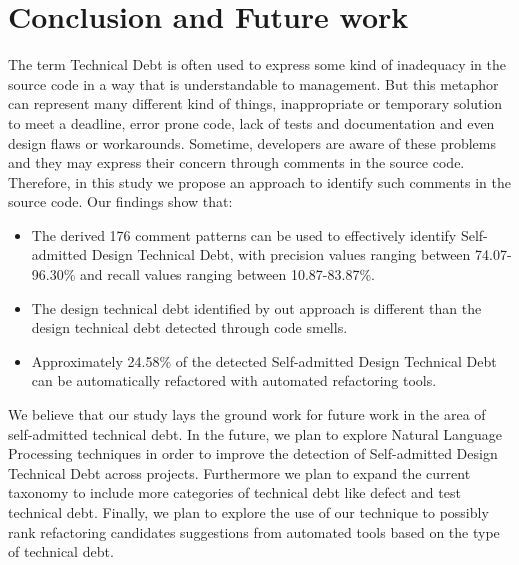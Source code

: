 \documentclass[conference]{IEEEtran}
\newcommand{\SADTD}{Self-admitted Design Technical Debt\xspace}
\begin{document}
\section{Conclusion and Future work}
\label{sec:conclusion}

The term Technical Debt is often used to express some kind of inadequacy in the source code in a way that is understandable to management. But this metaphor can represent many different kind of things, inappropriate or temporary solution to meet a deadline, error prone code, lack of tests and documentation and even design flaws or workarounds. Sometime, developers are aware of these problems and they may express their concern through comments in the source code. Therefore, in this study we propose an approach to identify such comments in the source code. Our findings show that:

\begin{itemize}
\item The derived 176 comment patterns can be used to effectively identify \SADTD, with precision values ranging between 74.07-96.30\% and recall values ranging between 10.87-83.87\%.
\item The design technical debt identified by out approach is different than the design technical debt detected through code smells. 

\item Approximately 24.58\% of the detected \SADTD can be automatically refactored with automated refactoring tools.

\end{itemize} 


We believe that our study lays the ground work for future work in the area of self-admitted technical debt. In the future, we plan to explore Natural Language Processing techniques in order to improve the detection of \SADTD across projects. Furthermore we plan to expand the current taxonomy to include more categories of technical debt like defect and test technical debt. Finally, we plan to explore the use of our technique to possibly rank refactoring candidates suggestions from automated tools based on the type of technical debt. 


\balance





\end{document}
